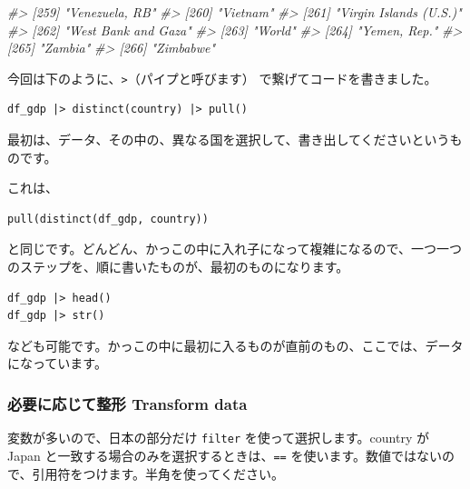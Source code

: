 \documentclass[
  xelatex, ja=standard]{bxjsbook}
\newenvironment{Shaded}{\begin{snugshade}}{\end{snugshade}}
\newcommand{\CommentTok}[1]{\textcolor[rgb]{0.56,0.35,0.01}{\textit{#1}}}
\theoremstyle{definition}
\theoremstyle{definition}
\theoremstyle{definition}
\theoremstyle{definition}
\theoremstyle{remark}
\begin{document}
\begin{Shaded}
\begin{Highlighting}[]
\CommentTok{\#\textgreater{} [259] "Venezuela, RB"                                       }
\CommentTok{\#\textgreater{} [260] "Vietnam"                                             }
\CommentTok{\#\textgreater{} [261] "Virgin Islands (U.S.)"                               }
\CommentTok{\#\textgreater{} [262] "West Bank and Gaza"                                  }
\CommentTok{\#\textgreater{} [263] "World"                                               }
\CommentTok{\#\textgreater{} [264] "Yemen, Rep."                                         }
\CommentTok{\#\textgreater{} [265] "Zambia"                                              }
\CommentTok{\#\textgreater{} [266] "Zimbabwe"}
\end{Highlighting}
\end{Shaded}

今回は下のように、\texttt{\textbar{}\textgreater{}}（パイプと呼びます） で繋げてコードを書きました。

\begin{verbatim}
df_gdp |> distinct(country) |> pull()
\end{verbatim}

最初は、データ、その中の、異なる国を選択して、書き出してくださいというものです。

これは、

\begin{verbatim}
pull(distinct(df_gdp, country))
\end{verbatim}

と同じです。どんどん、かっこの中に入れ子になって複雑になるので、一つ一つのステップを、順に書いたものが、最初のものになります。

\begin{verbatim}
df_gdp |> head()
df_gdp |> str()
\end{verbatim}

なども可能です。かっこの中に最初に入るものが直前のもの、ここでは、データになっています。

\hypertarget{ux5fc5ux8981ux306bux5fdcux3058ux3066ux6574ux5f62-transform-data-1}{%
\subsubsection{必要に応じて整形 Transform data}\label{ux5fc5ux8981ux306bux5fdcux3058ux3066ux6574ux5f62-transform-data-1}}

変数が多いので、日本の部分だけ \texttt{filter} を使って選択します。country が Japan と一致する場合のみを選択するときは、\texttt{==} を使います。数値ではないので、引用符をつけます。半角を使ってください。
\end{document}
